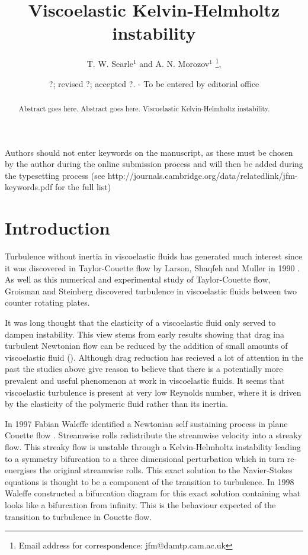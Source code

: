 \documentclass{jfm}
\title[Viscoelastic Kelvin-Helmholtz instabilty]{Viscoelastic Kelvin-Helmholtz instability}
\author[T. W. Searle and A. N. Morozov]%
{T. W. Searle$^1$ and A. N. Morozov$^1$%
  \thanks{Email address for correspondence: jfm@damtp.cam.ac.uk},\ns
}
\affiliation{$^1$SUPA, School of Physics and Astronomy, University of Edinburgh, Mayfield Road,
Edinburgh, EH9 3JZ, UK\\[\affilskip]
}
\date{?; revised ?; accepted ?. - To be entered by editorial office}
\begin{document}
\maketitle

\begin{abstract}
  Abstract goes here. Abstract goes here. Viscoelastic Kelvin-Helmholtz instability. 
\end{abstract}

\begin{keywords}
Authors should not enter keywords on the manuscript, as these must be chosen by
the author during the online submission process and will then be added during
the typesetting process (see
http://journals.cambridge.org/data/\linebreak[3]relatedlink/jfm-\linebreak[3]keywords.pdf
for the full list)
\end{keywords}

\section{Introduction}

Turbulence without inertia in viscoelastic fluids has generated much interest
since it was discovered in Taylor-Couette flow by Larson, Shaqfeh and Muller in
1990 \cite{Larson1990}. As well as this numerical and experimental study of
Taylor-Couette flow, Groisman and Steinberg \cite{Groisman2000} discovered
turbulence in viscoelastic fluids between two counter rotating plates.

It was long thought that the elasticity of a viscoelastic fluid only served to
dampen instability. This view stems from early results showing that drag ina
turbulent Newtonian flow can be reduced by the addition of small amounts of
viscoelastic fluid (\cite{Toms1977}). Although drag reduction has recieved a
lot of attention in the past the studies above give reason to believe that
there is a potentially more prevalent and useful phenomenon at work in
viscoelastic fluids. It seems that viscoelastic turbulence is present at very
low Reynolds number, where it is driven by the elasticity of the polymeric
fluid rather than its inertia.

In 1997 Fabian Waleffe identified a Newtonian self sustaining process in plane
Couette flow \cite{Waleffe1997}. Streamwise rolls redistribute the streamwise
velocity into a streaky flow. This streaky flow is unstable through a
Kelvin-Helmholtz instability leading to a symmetry bifurcation to a three
dimensional perturbation which in turn re-energises the original streamwise
rolls. This exact solution to the Navier-Stokes equations is thought to be a
component of the transition to turbulence. In 1998 Waleffe constructed a
bifurcation diagram for this exact solution \cite{Waleffe1998} containing what
looks like a bifurcation from infinity. This is the behaviour expected of the
transition to turbulence in Couette flow.
\end{document}
